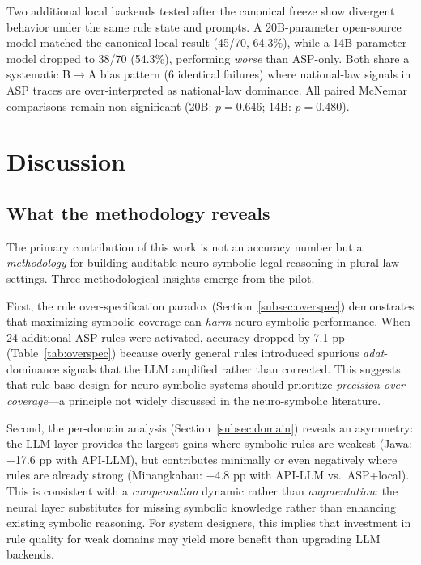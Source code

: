 \documentclass[pdflatex,sn-basic,Numbered]{sn-jnl}
\begin{document}
Two additional local backends tested after the canonical freeze show divergent behavior under the same rule state and prompts.
A 20B-parameter open-source model matched the canonical local result (45/70, 64.3\%), while a 14B-parameter model dropped to 38/70 (54.3\%), performing \textit{worse} than ASP-only.
Both share a systematic B$\rightarrow$A bias pattern (6 identical failures) where national-law signals in ASP traces are over-interpreted as national-law dominance.
All paired McNemar comparisons remain non-significant (20B: $p = 0.646$; 14B: $p = 0.480$).

\section{Discussion}\label{sec:discussion}

\subsection{What the methodology reveals}\label{subsec:disc-method}

The primary contribution of this work is not an accuracy number but a \textit{methodology} for building auditable neuro-symbolic legal reasoning in plural-law settings.
Three methodological insights emerge from the pilot.

First, the rule over-specification paradox (Section~\ref{subsec:overspec}) demonstrates that maximizing symbolic coverage can \textit{harm} neuro-symbolic performance.
When 24 additional ASP rules were activated, accuracy dropped by 7.1 pp (Table~\ref{tab:overspec}) because overly general rules introduced spurious \textit{adat}-dominance signals that the LLM amplified rather than corrected.
This suggests that rule base design for neuro-symbolic systems should prioritize \textit{precision over coverage}---a principle not widely discussed in the neuro-symbolic literature.

Second, the per-domain analysis (Section~\ref{subsec:domain}) reveals an asymmetry: the LLM layer provides the largest gains where symbolic rules are weakest (Jawa: +17.6 pp with API-LLM), but contributes minimally or even negatively where rules are already strong (Minangkabau: $-$4.8 pp with API-LLM vs.\ ASP+local).
This is consistent with a \textit{compensation} dynamic rather than \textit{augmentation}: the neural layer substitutes for missing symbolic knowledge rather than enhancing existing symbolic reasoning.
For system designers, this implies that investment in rule quality for weak domains may yield more benefit than upgrading LLM backends.
\end{document}
